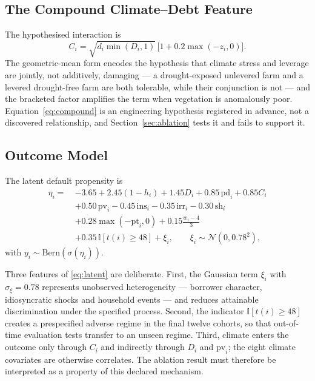 \documentclass[journal]{IEEEtran}
\begin{document}
\subsection{The Compound Climate--Debt Feature}
\label{sec:compound}
The hypothesised interaction is
\begin{equation}
C_i=\sqrt{d_i\min(D_i,1)}\,\bigl[1+0.2\max(-z_i,0)\bigr].
\label{eq:compound}
\end{equation}
The geometric-mean form encodes the hypothesis that climate stress and leverage are jointly, not additively, damaging --- a drought-exposed unlevered farm and a levered drought-free farm are both tolerable, while their conjunction is not --- and the bracketed factor amplifies the term when vegetation is anomalously poor. Equation~\eqref{eq:compound} is an engineering hypothesis registered in advance, not a discovered relationship, and Section~\ref{sec:ablation} tests it and fails to support it.

\subsection{Outcome Model}
The latent default propensity is
\begin{align}
\eta_i =\ & -3.65 + 2.45(1-h_i) + 1.45 D_i + 0.85\,\text{pd}_i + 0.85 C_i \nonumber\\
& + 0.50\,\text{pv}_i - 0.45\,\text{ins}_i - 0.35\,\text{irr}_i - 0.30\,\text{sh}_i \nonumber\\
& + 0.28\max(-\text{pt}_i,0) + 0.15\tfrac{w_i-4}{3} \nonumber\\
& + 0.35\,\mathbb{I}[t(i)\ge 48] + \xi_i, \qquad \xi_i\sim\mathcal{N}(0,0.78^2),
\label{eq:latent}
\end{align}
with $y_i\sim\text{Bern}(\sigma(\eta_i))$.

Three features of \eqref{eq:latent} are deliberate. First, the Gaussian term $\xi_i$ with $\sigma_\xi=0.78$ represents unobserved heterogeneity --- borrower character, idiosyncratic shocks and household events --- and reduces attainable discrimination under the specified process. Second, the indicator $\mathbb{I}[t(i)\ge48]$ creates a prespecified adverse regime in the final twelve cohorts, so that out-of-time evaluation tests transfer to an unseen regime. Third, climate enters the outcome only through $C_i$ and indirectly through $D_i$ and $\text{pv}_i$; the eight climate covariates are otherwise correlates. The ablation result must therefore be interpreted as a property of this declared mechanism.
\end{document}
